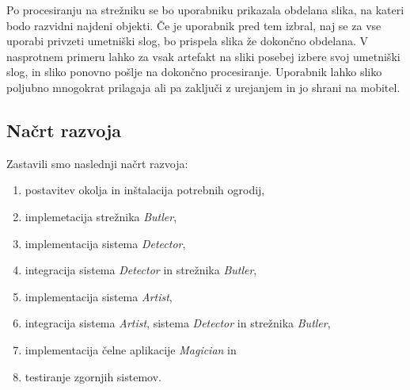 \documentclass[runningheads,a4paper]{llncs}
\begin{document}
Po procesiranju na strežniku se bo uporabniku prikazala obdelana slika, na kateri bodo razvidni najdeni objekti. Če je uporabnik pred tem izbral, naj se za vse uporabi privzeti umetniški slog, bo prispela slika že dokončno obdelana. V nasprotnem primeru lahko za vsak artefakt na sliki posebej izbere svoj umetniški slog, in sliko ponovno pošlje na dokončno procesiranje. Uporabnik lahko sliko poljubno mnogokrat prilagaja ali pa zaključi z urejanjem in jo shrani na mobitel.

\subsection{Načrt razvoja}

Zastavili smo naslednji načrt razvoja:
\begin{enumerate}
\item postavitev okolja in inštalacija potrebnih ogrodij,
\item implemetacija strežnika \textit{Butler},
\item implementacija sistema \textit{Detector},
\item integracija sistema \textit{Detector} in strežnika \textit{Butler},
\item implementacija sistema \textit{Artist},
\item integracija sistema \textit{Artist}, sistema \textit{Detector} in strežnika \textit{Butler},
\item implementacija čelne aplikacije \textit{Magician} in
\item testiranje zgornjih sistemov.
\end{enumerate}



\end{document}
